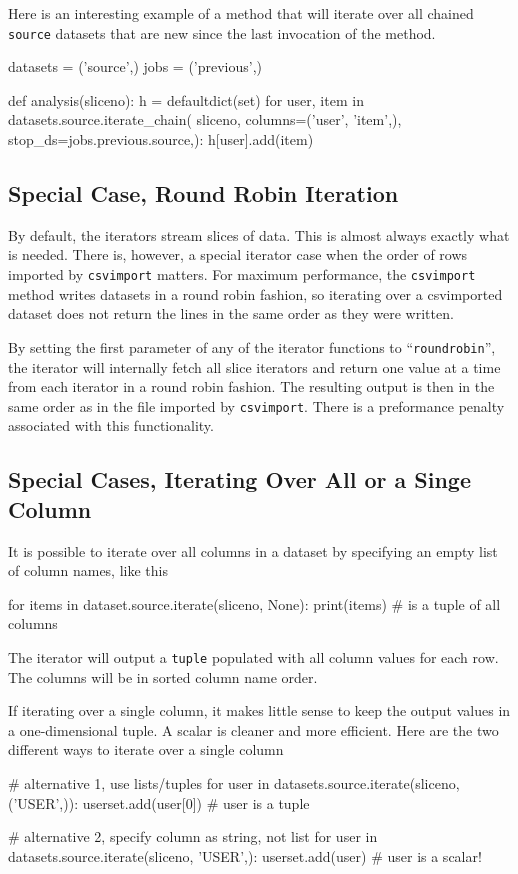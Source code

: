 Here is an interesting example of a method that will iterate over all
chained \texttt{source} datasets that are new since the last
invocation of the method.
\begin{python}
datasets = ('source',)
jobs = ('previous',)

def analysis(sliceno):
    h = defaultdict(set)
    for user, item in datasets.source.iterate_chain(
                           sliceno, columns=('user', 'item',),
                           stop_ds=jobs.previous.source,):
        h[user].add(item)
\end{python}



\subsection{Special Case, Round Robin Iteration}
By default, the iterators stream slices of data.  This is almost
always exactly what is needed.  There is, however, a special iterator
case when the order of rows imported by \texttt{csvimport} matters.
For maximum performance, the \texttt{csvimport} method writes datasets
in a round robin fashion, so iterating over a csvimported dataset does
not return the lines in the same order as they were written.

By setting the first parameter of any of the iterator functions to
``\texttt{roundrobin}'', the iterator will internally fetch all slice iterators
and return one value at a time from each iterator in a round robin
fashion.  The resulting output is then in the same order as in the
file imported by \texttt{csvimport}.  There is a preformance penalty
associated with this functionality.



\subsection{Special Cases, Iterating Over All or a Singe Column}
It is possible to iterate over all columns in a dataset by specifying
an empty list of column names, like this
\begin{python}
for items in dataset.source.iterate(sliceno, None):
    print(items)  # is a tuple of all columns
\end{python}
The iterator will output a \texttt{tuple} populated with all column
values for each row.  The columns will be in sorted column name order.

If iterating over a single column, it makes little sense to keep the
output values in a one-dimensional tuple.  A scalar is cleaner and
more efficient.  Here are the two different ways to iterate over a
single column
\begin{python}
# alternative 1, use lists/tuples
for user in datasets.source.iterate(sliceno, ('USER',)):
    userset.add(user[0])  # user is a tuple

# alternative 2, specify column as string, not list
for user in datasets.source.iterate(sliceno, 'USER',):
    userset.add(user)     # user is a scalar!
\end{python}



